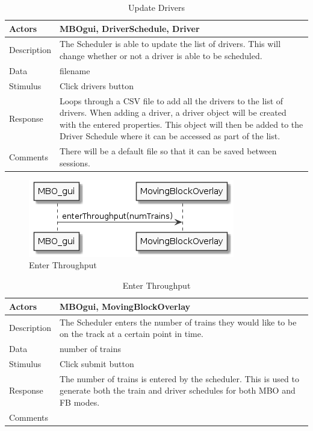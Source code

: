 \documentclass[]{article}
\begin{document}
	\begin{table}[H]
		\centering
		\caption{Update Drivers}
		\begin{tabular}{|l|l|}
			\hline
			Actors & \parbox[t]{10cm}{MBOgui, DriverSchedule, Driver} \\ \hline
			Description & \parbox[t]{10cm}{The Scheduler is able to update the list of drivers. This will change whether or not a driver is able to be scheduled.} \\ \hline
			Data &  \parbox[t]{10cm}{filename} \\ \hline
			Stimulus &  \parbox[t]{10cm}{Click drivers button} \\ \hline
			Response & \parbox[t]{10cm}{Loops through a CSV file to add all the drivers to the list of drivers. When adding a driver, a driver object will be created with the entered properties. This object will then be added to the Driver Schedule where it can be accessed as part of the list.}\\ \hline
			Comments & \parbox[t]{10cm}{There will be a default file so that it can be saved between sessions.}  \\ \hline
		\end{tabular}
	\end{table}
	
	\begin{figure}[H]
		\centering
		\includegraphics{enterThroughput.png}
		\caption{Enter Throughput}
	\end{figure}
	
	\begin{table}[H]
		\centering
		\caption{Enter Throughput}
		\begin{tabular}{|l|l|}
			\hline
			Actors & \parbox[t]{10cm}{MBOgui, MovingBlockOverlay} \\ \hline
			Description & \parbox[t]{10cm}{The Scheduler enters the number of trains they would like to be on the track at a certain point in time.} \\ \hline
			Data &  \parbox[t]{10cm}{number of trains} \\ \hline
			Stimulus &  \parbox[t]{10cm}{Click submit button} \\ \hline
			Response & \parbox[t]{10cm}{The number of trains is entered by the scheduler. This is used to generate both the train and driver schedules for both MBO and FB modes.}\\ \hline
			Comments & \parbox[t]{10cm}{}  \\ \hline
		\end{tabular}
	\end{table}
	
\end{document}
